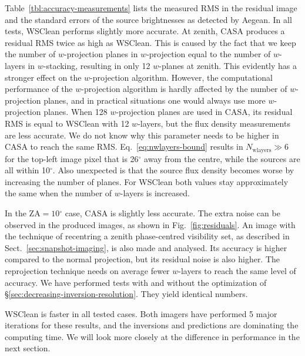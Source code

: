 \documentclass[useAMS,usenatbib]{mn2e}
\newcommand{\degree}{\ensuremath{^{\circ}}\xspace}
\begin{document}
Table~\ref{tbl:accuracy-measurements} lists the measured RMS in the residual image and the standard errors of the source brightnesses as detected by Aegean. In all tests, WSClean performs slightly more accurate. At zenith, CASA produces a residual RMS twice as high as WSClean. This is caused by the fact that we keep the number of $w$-projection planes in $w$-projection equal to the number of $w$-layers in $w$-stacking, resulting in only 12 $w$-planes at zenith. This evidently has a stronger effect on the $w$-projection algorithm. However, the computational performance of the $w$-projection algorithm is hardly affected by the number of $w$-projection planes, and in practical situations one would always use more $w$-projection planes. When 128 $w$-projection planes are used in CASA, its residual RMS is equal to WSClean with 12 $w$-layers, but the flux density measurements are less accurate. We do not know why this parameter needs to be higher in CASA to reach the same RMS.  Eq.~\eqref{eq:nwlayers-bound} results in $N_\textrm{wlayers}\gg 6$ for the top-left image pixel that is 26\degree away from the centre, while the sources are all within 10\degree. Also unexpected is that the source flux density becomes worse by increasing the number of planes. For WSClean both values stay approximately the same when the number of $w$-layers is increased.

In the $\textrm{ZA}=10\degree$ case, CASA is slightly less accurate. The extra noise can be observed in the produced images, as shown in Fig.~\ref{fig:residuals}. An image with the technique of recentring a zenith phase-centred visibility set, as described in Sect.~\ref{sec:snapshot-imaging}, is also made and analysed. Its accuracy is higher compared to the normal projection, but its residual noise is also higher. The reprojection technique needs on average fewer $w$-layers to reach the same level of accuracy. We have performed tests with and without the optimization of \S\ref{sec:decreasing-inversion-resolution}. They yield identical numbers.

WSClean is faster in all tested cases. Both imagers have performed 5 major iterations for these results, and the inversions and predictions are dominating the computing time. We will look more closely at the difference in performance in the next section.
\end{document}
